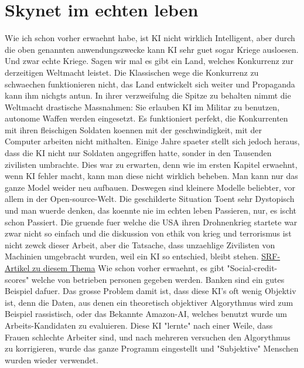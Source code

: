 \documentclass{report}
\begin{document}
\section{Skynet im echten leben}
Wie ich schon vorher erwaehnt habe, ist KI nicht wirklich Intelligent, aber durch die oben genannten anwendungszwecke kann KI sehr guet sogar Kriege ausloesen. Und zwar echte Kriege.
\newline
Sagen wir mal es gibt ein Land, welches Konkurrenz zur derzeitigen Weltmacht leistet. Die Klassischen wege die Konkurrenz zu schwaechen funktionieren nicht, das Land entwickelt sich weiter und Propaganda kann ihm nichgts antun. In ihrer verzweifulng die Spitze zu behalten nimmt die Weltmacht drastische Massnahmen: Sie erlauben KI im Militar zu benutzen, autonome Waffen werden eingesetzt. Es funktioniert perfekt, die Konkurrenten mit ihren fleischigen Soldaten koennen mit der geschwindigkeit, mit der Computer arbeiten nicht mithalten. Einige Jahre spaeter stellt sich jedoch heraus, dass die KI nicht nur Soldaten angegriffen hatte, sonder in den Tausenden zivilisten umbrachte. Dies war zu erwarten, denn wie im ersten Kapitel erwaehnt, wenn KI fehler macht, kann man diese nicht wirklich beheben. Man kann nur das ganze Model weider neu aufbauen. Deswegen sind kleinere Modelle beliebter, vor allem in der Open-source-Welt.
\newline
\newline
Die geschilderte Situation Toent sehr Dystopisch und man wuerde denken, das koennte nie im echten leben Passieren, nur, es ischt schon Passiert. Die gruende fuer welche die USA ihren Drohnenkrieg startete war zwar nicht so einfach und die diskussion von ethik von krieg und terrorismus ist nicht zewck dieser Arbeit, aber die Tatsache, dass unzaehlige Zivilisten von Machinien umgebracht wurden, weil ein KI so entschied, bleibt stehen.
\hyperlink{https://www.srf.ch/news/international/tausende-zivile-opfer-der-schmutzige-drohnenkrieg-der-usa}{SRF-Artikel zu diesem Thema}
\newline
Wie schon vorher erwaehnt, es gibt "Social-credit-scores" welche von betrieben personen gegeben werden. Banken sind ein gutes Beispiel dafuer. Das grosse Problem damit ist, dass diese KI's oft wenig Objektiv ist, denn die Daten, aus denen ein theoretisch objektiver Algorythmus wird zum Beispiel rassistisch, oder das Bekannte Amazon-AI, welches benutzt wurde um Arbeits-Kandidaten zu evaluieren. Diese KI "lernte" nach einer Weile, dass Frauen schlechte Arbeiter sind, und nach mehreren versuchen den Algorythmus zu korrigieren, wurde das ganze Programm eingestellt und "Subjektive" Menschen wurden wieder verwendet.
\end{document}
